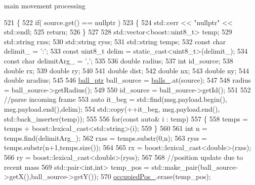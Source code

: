 main movement processing 


\begin{DoxyCode}
521      \{
522         \textcolor{keywordflow}{if}( source.get() == nullptr )
523         \{
524             std::cerr  << \textcolor{stringliteral}{"nullptr"} << std::endl;
525             \textcolor{keywordflow}{return};
526         \}
527         
528         std::vector<boost::uint8\_t> temp;
529         std::string rxss;
530         std::string ryss;
531         std::string temps;
532         \textcolor{keyword}{const} \textcolor{keywordtype}{char} delimit\_ = \textcolor{charliteral}{':'};
533         \textcolor{keyword}{const} uint8\_t delim = \textcolor{keyword}{static\_cast<}uint8\_t\textcolor{keyword}{>}(delimit\_);
534         \textcolor{keyword}{const} \textcolor{keywordtype}{char} delimitArg\_ = \textcolor{charliteral}{','};
535         
536         \textcolor{keywordtype}{double} radius;
537         \textcolor{keywordtype}{int} id\_source;
538         \textcolor{keywordtype}{double} rx;
539         \textcolor{keywordtype}{double} ry;
540 
541         \textcolor{keywordtype}{double} dist;
542         \textcolor{keywordtype}{double} nx;
543         \textcolor{keywordtype}{double} ny;
544         \textcolor{keywordtype}{double} nradius;
545      
546         \hyperlink{namespacewebsocket_aae1d9cf317a0fb0b83bdfc2f92df77c7}{ball\_ptr} ball\_source = \hyperlink{classwebsocket_1_1GameBoard_a8bdb65edb9742890aa150d5c7c5b7209}{balls\_}.at(source);
547 
548         radius = ball\_source->getRadius();
549         
550         id\_source = ball\_source->getId();
551         
552         \textcolor{comment}{//parse incoming frame}
553         \textcolor{keyword}{auto} it\_beg = std::find(msg.payload.begin(), msg.payload.end(),delim);
554         std::copy(++it\_beg, msg.payload.end(), std::back\_inserter(temp));
555 
556         \textcolor{keywordflow}{for}(\textcolor{keyword}{const} \textcolor{keyword}{auto}& i : temp)
557         \{
558             temps = temps +  boost::lexical\_cast<std::string>(i);
559         \}
560 
561         \textcolor{keywordtype}{int} n = temps.find(delimitArg\_);
562         rxss = temps.substr(0,n);
563         ryss = temps.substr(n+1,temps.size());
564 
565         rx = boost::lexical\_cast<\textcolor{keywordtype}{double}>(rxss);
566         ry = boost::lexical\_cast<\textcolor{keywordtype}{double}>(ryss);
567         
568         \textcolor{comment}{//position update due to recent mass}
569         std::pair<int,int> temp\_pos = std::make\_pair(ball\_source->getX(),ball\_source->getY());
570         \hyperlink{classwebsocket_1_1GameBoard_aca1010defacfdd0ea5f032035ce7105e}{occupiedPos\_}.erase(temp\_pos);

\end{DoxyCode}
